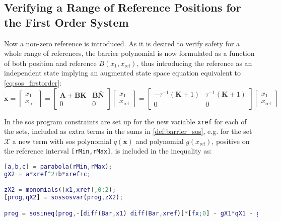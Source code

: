 \subsection{Verifying a Range of Reference Positions for the First Order System}\label{sec:sos_1storder_references}

\vspace{-2mm}
Now a non-zero reference is introduced. As it is desired to verify safety for a whole range of references, the barrier polynomial is now formulated as a function of both position and reference $B(x_1,x_\text{ref})$, thus introducing the reference as an independent state implying an augmented state space equation equivalent to \autoref{eq:sos_firstorder}: 
\begin{equation}
\dot{\mathbf{x}}=\dot{\begin{bmatrix}
x_1\\x_\text{ref}
\end{bmatrix}} 
= \begin{bmatrix}
\mathbf{A}+\textbf{BK} & \textbf{B}\bar{\mathbf{N}}\\
0 & 0
\end{bmatrix}
\begin{bmatrix}
x_1\\x_\text{ref}
\end{bmatrix}
= \begin{bmatrix}
-\tau^{-1}(\mathbf{K}+1) & \tau^{-1}(\mathbf{K}+1)\\
0 & 0
\end{bmatrix}
\begin{bmatrix}
x_1\\x_\text{ref}
\end{bmatrix}
\label{eq:1storder_augmented}
\end{equation}

In the \gls{sos} program constraints are set up for the new variable \texttt{xref}  for each of the sets, included as extra terms in the sums in \autoref{def:barrier_sos}, e.g. for the set $\mathcal{X}$ a new term with \gls{sos} polynomial $q(\mathbf{x})$ and polynomial $g(x_\text{ref})$, positive on the  reference  interval \texttt{[rMin,rMax]}, is included in the inequality as:
\begin{lstlisting}[language=matlab]
% Constraint on the set X being nonpositive for the interval of references 
[a,b,c] = parabola(rMin,rMax); 
gX2 = a*xref^2+b*xref+c;

zX2 = monomials([x1,xref],0:2);
[prog,qX2] = sossosvar(prog,zX2);

prog = sosineq(prog,-[diff(Bar,x1) diff(Bar,xref)]*[fx;0] - gX1*qX1 - gX2*qX2);
\end{lstlisting}

